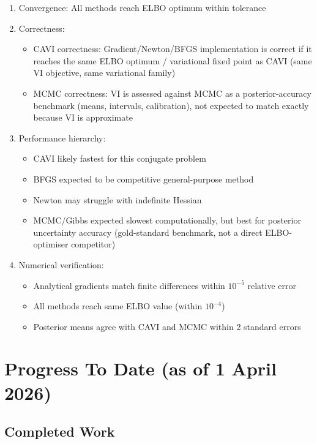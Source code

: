 \documentclass[11pt]{article}
\begin{document}
\begin{enumerate}
\item Convergence: All methods reach ELBO optimum within tolerance
\item Correctness:
\begin{itemize}
\item CAVI correctness: Gradient/Newton/BFGS implementation is correct if it reaches the same ELBO optimum / variational fixed point as CAVI (same VI objective, same variational family)
\item MCMC correctness: VI is assessed against MCMC as a posterior-accuracy benchmark (means, intervals, calibration), not expected to match exactly because VI is approximate
\end{itemize}
\item Performance hierarchy:
\begin{itemize} 
\item CAVI likely fastest for this conjugate problem
\item BFGS expected to be competitive general-purpose method
\item Newton may struggle with indefinite Hessian
\item MCMC/Gibbs expected slowest computationally, but best for posterior uncertainty accuracy (gold-standard benchmark, not a direct ELBO-optimiser competitor)
\end{itemize}
\item Numerical verification:
\begin{itemize}
\item Analytical gradients match finite differences within $10^{-5}$ relative error
\item All methods reach same ELBO value (within $10^{-4}$)
\item Posterior means agree with CAVI and MCMC within 2 standard errors
\end{itemize}
\end{enumerate}
 
\section*{Progress To Date (as of 1 April 2026)}

\subsection*{Completed Work}
\end{document}
